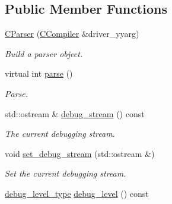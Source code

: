 \subsection*{Public Member Functions}
\begin{DoxyCompactItemize}
\item 
\hypertarget{classyy_1_1CParser_a86e43a3fcf9b1a9a1eeb4bbb16684cac}{\hyperlink{classyy_1_1CParser_a86e43a3fcf9b1a9a1eeb4bbb16684cac}{C\-Parser} (\hyperlink{classCCompiler}{C\-Compiler} \&driver\-\_\-yyarg)}\label{classyy_1_1CParser_a86e43a3fcf9b1a9a1eeb4bbb16684cac}

\begin{DoxyCompactList}\small\item\em Build a parser object. \end{DoxyCompactList}\item 
virtual int \hyperlink{classyy_1_1CParser_ace3666da2e8f28c47b7c3ce313b72612}{parse} ()
\begin{DoxyCompactList}\small\item\em Parse. \end{DoxyCompactList}\item 
\hypertarget{classyy_1_1CParser_a5cf8deefd69f161cb9cf1fb18a6fa33a}{std\-::ostream \& \hyperlink{classyy_1_1CParser_a5cf8deefd69f161cb9cf1fb18a6fa33a}{debug\-\_\-stream} () const }\label{classyy_1_1CParser_a5cf8deefd69f161cb9cf1fb18a6fa33a}

\begin{DoxyCompactList}\small\item\em The current debugging stream. \end{DoxyCompactList}\item 
\hypertarget{classyy_1_1CParser_ac7ec97c13cd0b7b488bfbaf9fb208bc9}{void \hyperlink{classyy_1_1CParser_ac7ec97c13cd0b7b488bfbaf9fb208bc9}{set\-\_\-debug\-\_\-stream} (std\-::ostream \&)}\label{classyy_1_1CParser_ac7ec97c13cd0b7b488bfbaf9fb208bc9}

\begin{DoxyCompactList}\small\item\em Set the current debugging stream. \end{DoxyCompactList}\item 
\hypertarget{classyy_1_1CParser_a1c6a8cae53a6ab9e0f63f61bddd4ed9d}{\hyperlink{classyy_1_1CParser_aeacca32970a6225584a65508390263af}{debug\-\_\-level\-\_\-type} \hyperlink{classyy_1_1CParser_a1c6a8cae53a6ab9e0f63f61bddd4ed9d}{debug\-\_\-level} () const }\label{classyy_1_1CParser_a1c6a8cae53a6ab9e0f63f61bddd4ed9d}


\end{DoxyCompactItemize}
